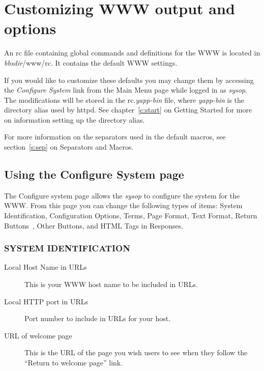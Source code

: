 \documentclass[twoside]{report}
\begin{document}
   \section{Customizing WWW output and options} \label{s:sysconfig}
      An rc file containing global commands and 
      definitions for the WWW is located in {\em bbsdir}/www/rc.  It contains 
      the default WWW settings. 
   
      If you would like to customize these defaults you may change them by 
      accessing the {\em Configure System} link 
      from the Main Menu page while logged in as {\em sysop}.  
      The modifications will be stored in the rc.{\em yapp-bin} file, where 
      {\em yapp-bin} is the directory alias used by httpd.  See 
      chapter~\ref{c:start} on Getting Started for more on information 
      setting up the directory alias.

      For more information on the separators used in the default macros, 
      see section~\ref{s:sep} on Separators and Macros.

      \subsection{Using the Configure System page}

      The Configure system page allows the {\em sysop} to configure the system 
      for the WWW.  From this page you can change the following types of items: 
      System Identification, Configuration Options, Terms, Page Format, 
      Text Format, Return Buttons~, Other Buttons, and 
      HTML Tags in Responses.

      \subsubsection*{SYSTEM IDENTIFICATION}
  
         \begin{description}
         \item[Local Host Name in URLs] 
         \mbox{}\newline
            This is your WWW host name to be included in URLs.

         \item[Local HTTP port in URLs] 
         \mbox{}\newline
            Port number to include in URLs for your host.

         \item[URL of welcome page]
         \mbox{}\newline
            This is the URL of the page you wish users to see when they follow 
            the ``Return to welcome page'' link.
         \end{description}
\end{document}
